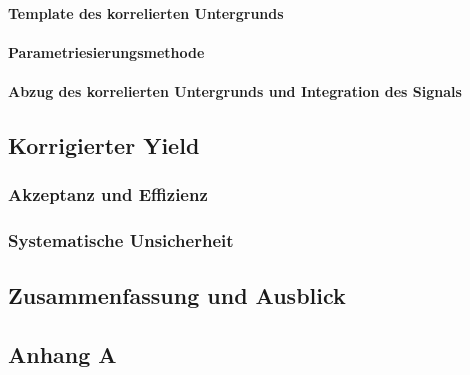 \documentclass[11pt]{article}
\renewcommand{\,}{,\!} %
\begin{document}
\subsubsection{Template des korrelierten Untergrunds} \label{s3s5s2}


\subsubsection{Parametriesierungsmethode} \label{s3s5s3}


\subsubsection{Abzug des korrelierten Untergrunds und Integration des Signals} \label{s3s5s4}

\newpage
\section{Korrigierter Yield} \label{s4}

\subsection{Akzeptanz und Effizienz} \label{s4s1}


\subsection{Systematische Unsicherheit} \label{s4s2}


\newpage
\section{Zusammenfassung und Ausblick} \label{s5}

\newpage

\begin{appendices}
\chapter{Anhang A}

\end{appendices}

\newpage
 

\end{document}
